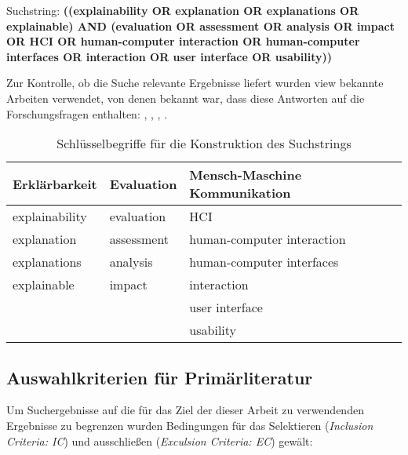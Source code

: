 \bigskip

\noindent Suchstring: \textbf{((explainability OR explanation OR explanations OR explainable) AND (evaluation OR assessment OR analysis OR impact OR HCI OR \glqq human-computer interaction\grqq{} OR \glqq human-computer interfaces \grqq{} OR interaction OR \glqq user interface\grqq{} OR usability))}

\bigskip

Zur Kontrolle, ob die Suche relevante Ergebnisse liefert wurden view bekannte Arbeiten verwendet, von denen bekannt war, dass diese Antworten auf die Forschungsfragen enthalten: \citeauthor{chazette_end-users_nodate} \cite{chazette_end-users_nodate}, \citeauthor{chazette2020explainability} \cite{chazette2020explainability}, \citeauthor{kohl_explainability_2019} \cite{kohl_explainability_2019}, \citeauthor{sokol_explainability_2020} \cite{sokol_explainability_2020}.

\begin{table}[htb!]
    \begin{tabular}{p{}p{}p{}}
        \hline
        Erklärbarkeit  & Evaluation & Mensch-Maschine Kommunikation             \\
        \toprule
        explainability          & evaluation    & HCI                           \\
        explanation             & assessment    & human-computer interaction    \\
        explanations            & analysis      & human-computer interfaces     \\
        explainable             & impact        & interaction                   \\
                                &               & user interface                \\
                                &               & usability                     \\              
        \toprule
    \end{tabular}
\caption{Schlüsselbegriffe für die Konstruktion des Suchstrings}
\label{tab:search_terms}
\end{table}

\subsection{Auswahlkriterien für Primärliteratur}

Um Suchergebnisse auf die für das Ziel der dieser Arbeit zu verwendenden Ergebnisse zu begrenzen wurden Bedingungen für das Selektieren (\textit{Inclusion Criteria: IC}) und ausschließen (\textit{Exculsion Criteria: EC}) gewält:

